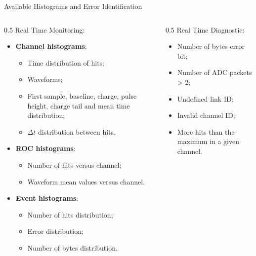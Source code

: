 \documentclass{beamer}[10pt]
\begin{document}
\begin{frame}{Available Histograms and Error Identification}
\begin{columns}
\begin{column}{0.5\framewidth}
Real Time Monitoring:
\begin{itemize}
\item  \textbf{Channel histograms}:
\begin{itemize}
\item Time distribution of hits;
\item Waveforms;
\item First sample, baseline, charge, pulse height, charge tail and mean time distribution;
\item $\Delta t$ distribution between hits.
\end{itemize}
\item \textbf{ROC histograms}:
\begin{itemize}
\item Number of hits versus channel;
\item Waveform mean values versus channel. 
\end{itemize}
\item \textbf{Event histograms}:
\begin{itemize}
\item Number of hits distribution;
\item Error distribution;
\item Number of bytes distribution.
\end{itemize}
\end{itemize}
\end{column}
\begin{column}{0.5\framewidth}
Real Time Diagnostic:
\vspace{6mm}
\begin{itemize}
\item Number of bytes error bit; 
\vspace{4mm}
\item Number of ADC packets > 2;
\vspace{4mm}
\item Undefined link ID;
\vspace{4mm}
\item Invalid channel ID;
\vspace{4mm}
\item More hits than the maximum in a given channel.
\end{itemize}
\end{column}
\end{columns}
\end{frame}
\end{document}
